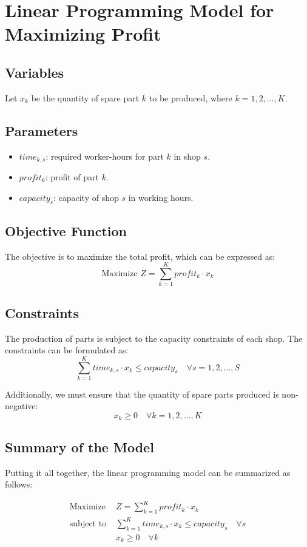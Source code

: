 \documentclass{article}
\begin{document}
\section*{Linear Programming Model for Maximizing Profit}

\subsection*{Variables}
Let \( x_k \) be the quantity of spare part \( k \) to be produced, where \( k = 1, 2, \ldots, K \).

\subsection*{Parameters}
\begin{itemize}
    \item \( time_{k,s} \): required worker-hours for part \( k \) in shop \( s \).
    \item \( profit_k \): profit of part \( k \).
    \item \( capacity_s \): capacity of shop \( s \) in working hours.
\end{itemize}

\subsection*{Objective Function}
The objective is to maximize the total profit, which can be expressed as:
\[
\text{Maximize } Z = \sum_{k=1}^{K} profit_k \cdot x_k
\]

\subsection*{Constraints}
The production of parts is subject to the capacity constraints of each shop. The constraints can be formulated as:
\[
\sum_{k=1}^{K} time_{k,s} \cdot x_k \leq capacity_s \quad \forall s = 1, 2, \ldots, S
\]

Additionally, we must ensure that the quantity of spare parts produced is non-negative:
\[
x_k \geq 0 \quad \forall k = 1, 2, \ldots, K
\]

\subsection*{Summary of the Model}
Putting it all together, the linear programming model can be summarized as follows:

\begin{align*}
\text{Maximize } & Z = \sum_{k=1}^{K} profit_k \cdot x_k \\
\text{subject to } & \sum_{k=1}^{K} time_{k,s} \cdot x_k \leq capacity_s \quad \forall s \\
& x_k \geq 0 \quad \forall k
\end{align*}
\end{document}
